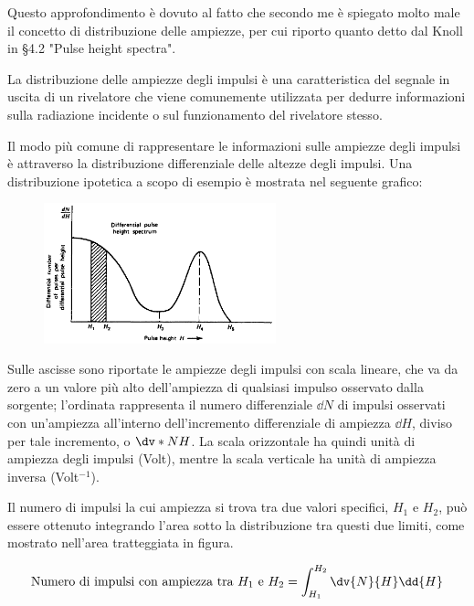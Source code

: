\begin{approfondimento}
   \footnotesize
   Questo approfondimento è dovuto al fatto che secondo me è spiegato molto male il concetto di distribuzione delle ampiezze, per cui riporto quanto detto dal Knoll in \S4.2 "Pulse height spectra".

   \vspace{0.2cm}La distribuzione delle ampiezze degli impulsi è una caratteristica del segnale in uscita di un rivelatore che viene comunemente utilizzata per dedurre informazioni sulla radiazione incidente o sul funzionamento del rivelatore stesso.

   Il modo più comune di rappresentare le informazioni sulle ampiezze degli impulsi è attraverso la distribuzione differenziale delle altezze degli impulsi. Una distribuzione ipotetica a scopo di esempio è mostrata nel seguente grafico:
   \begin{figure}[H]
      \centering
      \includegraphics[width=0.6\textwidth]{immagini/distribuzione_differenziale_ampiezze.png}
   \end{figure}
   Sulle ascisse sono riportate le ampiezze degli impulsi con scala lineare, che va da zero a un valore più alto dell'ampiezza di qualsiasi impulso osservato dalla sorgente; l'ordinata rappresenta il numero differenziale $\dd{N}$ di impulsi osservati con un'ampiezza all'interno dell'incremento differenziale di ampiezza $\dd{H}$, diviso per tale incremento, o $\dv*{N}{H}$. La scala orizzontale ha quindi unità di ampiezza degli impulsi (Volt), mentre la scala verticale ha unità di ampiezza inversa (Volt$^{-1}$).
   
   Il numero di impulsi la cui ampiezza si trova tra due valori specifici, $H_1$ e $H_2$, può essere ottenuto integrando l'area sotto la distribuzione tra questi due limiti, come mostrato nell'area tratteggiata in figura.

   \begin{equation*}
      \text{Numero di impulsi con ampiezza tra $H_1$ e $H_2$}
      =\int_{H_1}^{H_2} \dv{N}{H} \dd{H}
   \end{equation*}
   

\end{approfondimento}
